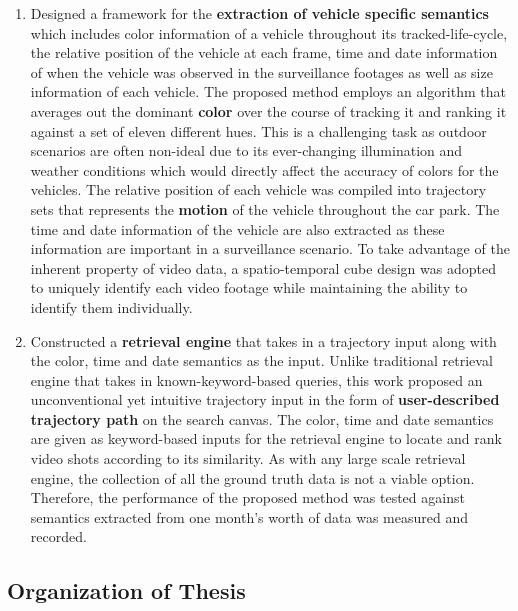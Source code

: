 \begin{enumerate}  
\item Designed a framework for the \textbf{extraction of vehicle specific semantics} which includes color information of a vehicle throughout its tracked-life-cycle, the relative position of the vehicle at each frame, time and date information of when the vehicle was observed in the surveillance footages as well as size information of each vehicle. The proposed method employs an algorithm that averages out the dominant \textbf{color} over the course of tracking it and ranking it against a set of eleven different hues. This is a challenging task as outdoor scenarios are often non-ideal due to its ever-changing illumination and weather conditions which would directly affect the accuracy of colors for the vehicles. The relative position of each vehicle was compiled into trajectory sets that represents the \textbf{motion} of the vehicle throughout the car park. The time and date information of the vehicle are also extracted as these information are important in a surveillance scenario. To take advantage of the inherent property of video data, a spatio-temporal cube design was adopted to uniquely identify each video footage while maintaining the ability to identify them individually.  
\item Constructed a \textbf{retrieval engine} that takes in a trajectory input along with the color, time and date semantics as the input. Unlike traditional retrieval engine that takes in known-keyword-based queries, this work proposed an unconventional yet intuitive trajectory input in the form of \textbf{user-described trajectory path} on the search canvas. The color, time and date semantics are given as keyword-based inputs for the retrieval engine to locate and rank video shots according to its similarity. As with any large scale retrieval engine, the collection of all the ground truth data is not a viable option. Therefore, the performance of the proposed method was tested against semantics extracted from one month's worth of data was measured and recorded. 
\end{enumerate}



\subsection{Organization of Thesis}

